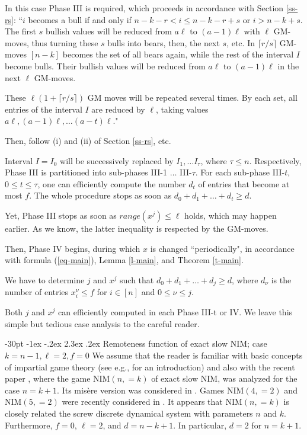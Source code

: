 \documentclass[10pt]{article}
\makeatletter
\renewcommand\section{\@startsection {section}{1}{\z@}
{-30pt \@plus -1ex \@minus -.2ex}
{2.3ex \@plus.2ex}
{\normalfont\normalsize\bfseries\boldmath}}
\theoremstyle{definition}
\makeatother
\begin{document}
In this case Phase III is required, 
which proceeds in accordance with Section \ref{ss-rs}:  
``$i$  becomes a bull if and only if   
$n-k-r < i \leq  n-k-r+s$  or $i > n-k+s$.  
\newline 
The first $s$  bullish values will be reduced 
from $a \ell$  to $(a-1) \ell$ with $\ell$ GM-moves, 
thus turning these $s$ bulls into bears, then, the next  $s$, etc. 
In $\lceil r/s \rceil$  GM-moves 
$[n-k]$  becomes the set of all bears again, while 
the rest of the interval $I$ become bulls. 
Their bullish values will be reduced 
from $a \ell$ to $(a-1) \ell$ in the next $\ell$ GM-moves.

These $\ell (1 + \lceil r/s \rceil)$ 
GM moves will be repeated several times. 
By each set, all entries of the interval  $I$ 
are reduced by  $\ell$,  
taking values  $a \ell, (a-1) \ell, \dots (a-t) \ell$."  

Then, follow (i) and (ii) of Section  \ref{ss-rs}, etc. 

Interval $I = I_0$  will be successively replaced by 
$I_1, \dots I_\tau$, where  $\tau \leq n$. 
\newline 
Respectively, Phase III is partitioned into 
sub-phases III-1 $\dots$ III-$\tau$.  
For each sub-phase III-$t$, $0 \leq t \leq \tau$,  
one can efficiently compute 
the number $d_t$ of entries that become at most $f$. 
The whole procedure stops as soon as 
$d_0 + d_1 + \dots + d_t \geq d$. 

Yet, Phase III stops as soon as $range(x^j) \leq \ell$ holds, 
which may happen earlier. 
As we know, the latter inequality is respected by the GM-moves. 

Then, Phase IV begins, 
during which $x$ is changed ``periodically", 
in accordance with formula (\ref{eq-main}), 
Lemma \ref{l-main},  and Theorem \ref{t-main}.

We have to determine $j$ and $x^j$ such that 
$d_0 + d_1 + \dots + d_j \geq d$,
where $d_{\nu}$ is the number of entries 
$x_i^\nu \leq f$ for $i \in [n]$ and $0 \leq \nu \leq j$.

Both   $j$ and $x^j$  can efficiently computed 
in each Phase III-t or IV. 
We leave this simple but tedious case analysis 
to the careful reader.

\section{Remoteness function of exact slow NIM; 
case $k=n-1,\ell=2,f=0$}
\label{s-games}
We assume that the reader is familiar 
with basic concepts of impartial game theory
(see e.g., \cite{ANW07,BCG01-04} for an introduction) 
and also with the recent paper \cite{GMMV23}, 
where the game NIM$(n,=k)$ of exact slow NIM,   
was analyzed for the case $n = k+1$.  
Its mis\`ere version was considered in \cite{GMMN23}.
Games NIM$(4,=2)$ and NIM$(5,=2)$ 
were recently considered in \cite{GMN23}.  
It appears that NIM$(n,=k)$ is closely related 
the screw discrete dynamical system 
with parameters $n$ and $k$. 
Furthermore, $f=0$, $\ell=2$, and $d=n-k+1$. 
In particular, $d =2$  for $n = k+1$.
\end{document}

